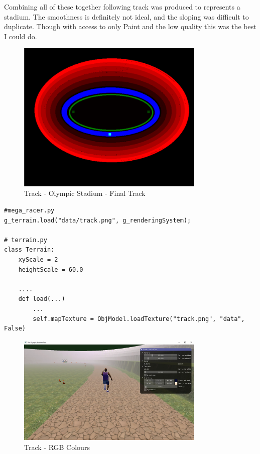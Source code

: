 \documentclass[a4 paper, 12pt]{article}
\begin{document}
Combining all of these together following track was produced to represents a stadium. The smoothness is definitely not ideal, and the sloping was difficult to duplicate. Though with access to only Paint and the low quality this was the best I could do. 
    \begin{figure} [H]
        \centering
        \includegraphics[width=0.8\textwidth, frame]
            {./images/olympics/track_final.PNG}  
        \caption{Track - Olympic Stadium - Final Track}   
    \end{figure}

    \begin{lstlisting}
#mega_racer.py    
g_terrain.load("data/track.png", g_renderingSystem);

# terrain.py
class Terrain:
    xyScale = 2
    heightScale = 60.0

    ....
    def load(...)
        ...    
        self.mapTexture = ObjModel.loadTexture("track.png", "data", False)
    \end{lstlisting}

\begin{figure} [H]
    \centering
    \includegraphics[width=0.8\textwidth, frame]
        {./images/olympics/map_world.PNG}  
    \caption{Track - RGB Colours}   
\end{figure}
\end{document}

